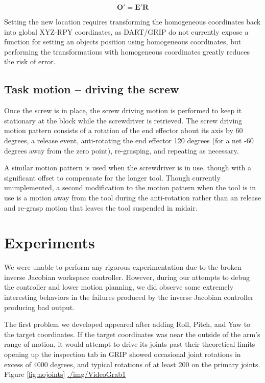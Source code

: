 \documentclass[10pt, conference]{IEEEtran}
\begin{document}
   \begin{equation}\label{eq:affineup}
   \mathbf{O'} = \mathbf{E'}\mathbf{R}
   \end{equation}

   Setting the new location requires transforming the homogeneous
   coordinates back into global XYZ-RPY coordinates, as DART/GRIP do not
   currently expose a function for setting an objects position using
   homogeneous coordinates, but performing the transformations with
   homogeneous coordinates greatly reduces the risk of error.
\subsection{Task motion -- driving the screw}
\label{sec-3-6}

   Once the screw is in place, the screw driving motion is performed to
   keep it stationary at the block while the screwdriver is
   retrieved. The screw driving motion pattern consists of a rotation of
   the end effector about its axis by 60 degrees, a release event,
   anti-rotating the end effector 120 degrees (for a net -60 degrees
   away from the zero point), re-grasping, and repeating as necessary.

   A similar motion pattern is used when the screwdriver is in use,
   though with a significant offset to compensate for the longer
   tool. Though currently unimplemented, a second modification to the
   motion pattern when the tool is in use is a motion away from the tool
   during the anti-rotation rather than an release and re-grasp motion
   that leaves the tool suspended in midair.
\section{Experiments}
\label{sec-4}

  We were unable to perform any rigorous experimentation due to the
  broken inverse Jacobian workspace controller. However, during our
  attempts to debug the controller and lower motion planning, we did
  observe some extremely interesting behaviors in the failures produced
  by the inverse Jacobian controller producing bad output.

  The first problem we developed appeared after adding Roll, Pitch, and Yaw to
  the target coordinates. If the target coordinates was near the outside
  of the arm's range of motion, it would attempt to drive its joints
  past their theoretical limits -- opening up the inspection tab in GRIP
  showed occasional joint rotations in excess of \textpm{} 4000 degrees, and
  typical rotations of at least \textpm{} 200 on the primary joints. Figure \ref{fig:nojoints}
  \href{file://../img/VideoGrab1}{./img/VideoGrab1}
\end{document}
